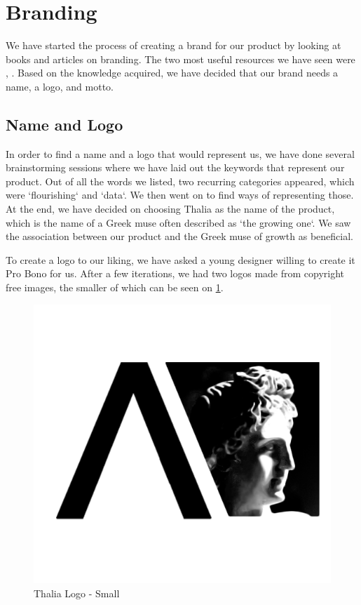 \documentclass[main.tex]{subfiles}
\begin{document}
\section{Branding}
\label{Branding}
We have started the process of creating a brand for our product by looking at books and articles on branding. The two most useful resources we have seen were  \cite{basics_branding}, \cite{clifton_2009}. Based on the knowledge acquired, we have decided that our brand needs a name, a logo, and motto.

\subsection{Name and Logo}
In order to find a name and a logo that would represent us, we have done several brainstorming sessions where we have laid out the keywords that represent our product. Out of all the words we listed, two recurring categories appeared, which were `flourishing` and `data`. We then went on to find ways of representing those. At the end, we have decided on choosing Thalia as the name of the product, which is the name of a Greek muse often described as `the growing one`. We saw the association between our product and the Greek muse of growth as beneficial.

To create a logo to our liking, we have asked a young designer willing to create it Pro Bono for us. After a few iterations, we had two logos made from copyright free images, the smaller of which can be seen on \figurename{\ref{small_logo}}.

\begin{figure}[H]
    \centering
    \includegraphics[scale=0.4]{00Branding/00Pictures/small_logo.png}
    \caption{Thalia Logo - Small}
    \label{small_logo}
\end{figure}
\end{document}
